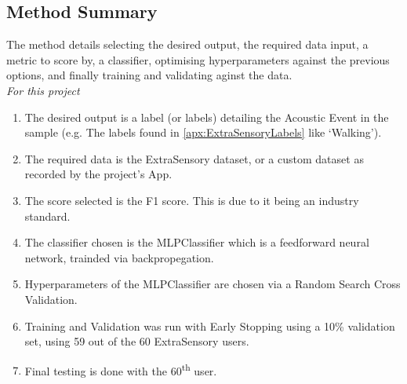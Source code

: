 \documentclass{UoNMCHA}
\newcommand{\flagforreview}{\textsuperscript{\color{red} [FLAGGED FOR REVIEW]}}
\newcommand{\inlineQuote}[1]{``#1''}
\numberwithin{equation}{section}
\begin{document}

\subsection{Method Summary}

The method details selecting the desired output, the required data input, a metric to score by, a classifier, optimising hyperparameters against the previous options, and finally training and validating aginst the data. \\

{\itshape For this project}
\begin{enumerate}
    \item The desired output is a label (or labels) detailing the Acoustic Event in the sample (e.g. The labels found in \ref{apx:ExtraSensoryLabels} like `Walking').
    \item The required data is the ExtraSensory dataset, or a custom dataset as recorded by the project's App.
    \item The score selected is the F1 score. This is due to it being an industry standard.
    \item The classifier chosen is the MLPClassifier which is a feedforward neural network, trainded via backpropegation.
    \item Hyperparameters of the MLPClassifier are chosen via a Random Search Cross Validation.
    \item Training and Validation was run with Early Stopping using a 10\% validation set, using 59 out of the 60 ExtraSensory users.
    \item Final testing is done with the 60\textsuperscript{th} user.
\end{enumerate}




\end{document}
